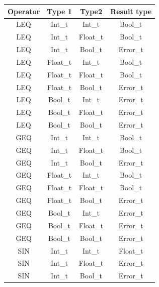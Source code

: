 \begin{figure}[H]
    \centering
    \begin{tabular}{cccc}
        \toprule
        \textbf{Operator} & \textbf{Type 1} & \textbf{Type2} & \textbf{Result type}\\
        \midrule LEQ & Int\_t & Int\_t      & Bool\_t \\
        \midrule LEQ & Int\_t & Float\_t    & Bool\_t \\
        \midrule LEQ & Int\_t & Bool\_t     & Error\_t \\

        \midrule LEQ & Float\_t & Int\_t    & Bool\_t \\
        \midrule LEQ & Float\_t & Float\_t  & Bool\_t \\
        \midrule LEQ & Float\_t & Bool\_t   & Error\_t \\

        \midrule LEQ & Bool\_t & Int\_t     & Error\_t \\
        \midrule LEQ & Bool\_t & Float\_t   & Error\_t \\
        \midrule LEQ & Bool\_t & Bool\_t    & Error\_t \\

        \midrule GEQ & Int\_t & Int\_t      & Bool\_t \\
        \midrule GEQ & Int\_t & Float\_t    & Bool\_t \\
        \midrule GEQ & Int\_t & Bool\_t     & Error\_t \\

        \midrule GEQ & Float\_t & Int\_t    & Bool\_t \\
        \midrule GEQ & Float\_t & Float\_t  & Bool\_t \\
        \midrule GEQ & Float\_t & Bool\_t   & Error\_t \\

        \midrule GEQ & Bool\_t & Int\_t     & Error\_t \\
        \midrule GEQ & Bool\_t & Float\_t   & Error\_t \\
        \midrule GEQ & Bool\_t & Bool\_t    & Error\_t \\

        \midrule SIN & Int\_t & Int\_t      & Float\_t \\
        \midrule SIN & Int\_t & Float\_t    & Error\_t \\
        \midrule SIN & Int\_t & Bool\_t     & Error\_t \\


\end{tabular}
\end{figure}

